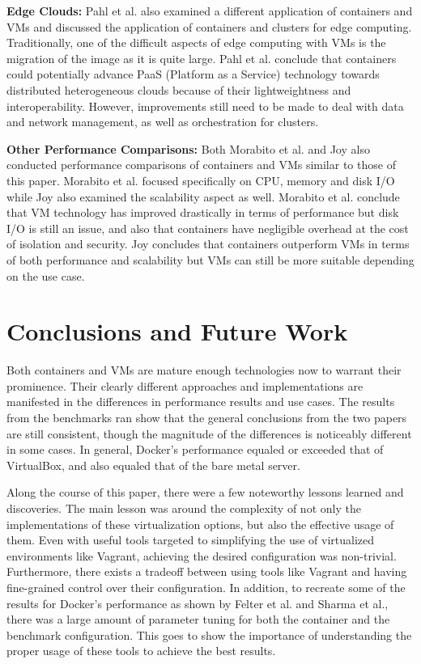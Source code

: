 \documentclass{sig-alternate-10pt}
\begin{document}
\textbf{Edge Clouds:} Pahl et al.\cite{pahl:2015} also examined a different application of containers and VMs and discussed the application of containers and clusters for edge computing. Traditionally, one of the difficult aspects of edge computing with VMs is the migration of the image as it is quite large. Pahl et al. conclude that containers could potentially advance PaaS (Platform as a Service) technology towards distributed heterogeneous clouds because of their lightweightness and interoperability\cite{pahl:2015}. However, improvements still need to be made to deal with data and network management, as well as orchestration for clusters.

\textbf{Other Performance Comparisons:} Both Morabito et al.\cite{morabito:2015} and Joy\cite{joy:2015} also conducted performance comparisons of containers and VMs similar to those of this paper. Morabito et al. focused specifically on CPU, memory and disk I/O while Joy also examined the scalability aspect as well. Morabito et al. conclude that VM technology has improved drastically in terms of performance but disk I/O is still an issue, and also that containers have negligible overhead at the cost of isolation and security\cite{morabito:2015}. Joy concludes that containers outperform VMs in terms of both performance and scalability but VMs can still be more suitable depending on the use case. 


\section{Conclusions and Future Work}
Both containers and VMs are mature enough technologies now to warrant their prominence. Their clearly different approaches and implementations are manifested in the differences in performance results and use cases. The results from the benchmarks ran show that the general conclusions from the two papers are still consistent, though the magnitude of the differences is noticeably different in some cases. In general, Docker's performance equaled or exceeded that of VirtualBox, and also equaled that of the bare metal server. 

Along the course of this paper, there were a few noteworthy lessons learned and discoveries. The main lesson was around the complexity of not only the implementations of these virtualization options, but also the effective usage of them. Even with useful tools targeted to simplifying the use of virtualized environments like Vagrant, achieving the desired configuration was non-trivial. Furthermore, there exists a tradeoff between using tools like Vagrant and having fine-grained control over their configuration. In addition, to recreate some of the results for Docker's performance as shown by Felter et al. and Sharma et al., there was a large amount of parameter tuning for both the container and the benchmark configuration. This goes to show the importance of understanding the proper usage of these tools to achieve the best results.
\end{document}
